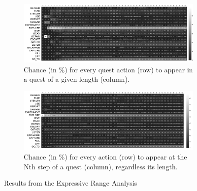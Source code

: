 


\begin{figure}[t]
    \centering
    \begin{subfigure}[t]{\textwidth}
        \centering
        \includegraphics[width=1\textwidth]{included-papers-tex/paper-8/figures/perLengthExperiment-an.png}
        \caption{Chance (in \%) for every quest action (row) to appear in a quest of a given length (column).}
        \label{figs:evaluation:length}
    \end{subfigure} \hfill%
    \begin{subfigure}[t]{0.9\textwidth}
        \centering
         \includegraphics[width=1\textwidth]{included-papers-tex/paper-8/figures/perStepsExperiment-an.png}
        \caption{Chance (in \%) for every action (row) to appear at the Nth step of a quest (column), regardless its length.}
        \label{figs:evaluation:steps}
    \end{subfigure}
    \caption{Results from the Expressive Range Analysis}
    \label{figs:Experiments}
\end{figure}

